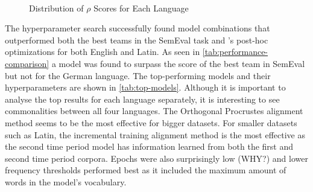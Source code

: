 \begin{figure}[h]
  \centering
  \quad
  \\
  \quad
  \caption{Distribution of $\rho$ Scores for Each Language}
  \label{fig:score-dist}
\end{figure}


The hyperparameter search successfully found model combinations that outperformed both the best teams in the SemEval task and \citet{kaiser-etal-2020-ims}’s post-hoc optimizations for both English and Latin. As seen in \autoref{tab:performance-comparison} a model was found to surpass the score of the best team in SemEval but not \citet{kaiser-etal-2020-ims} for the German language. The top-performing models and their hyperparameters are shown in \autoref{tab:top-models}. Although it is important to analyse the top results for each language separately, it is interesting to see commonalities between all four languages. The Orthogonal Procrustes alignment method seems to be the most effective for bigger datasets. For smaller datasets such as Latin, the incremental training alignment method is the most effective as the second time period model has information learned from both the first and second time period corpora. Epochs were also surprisingly low (WHY?) and lower frequency thresholds performed best as it included the maximum amount of words in the model’s vocabulary. 

